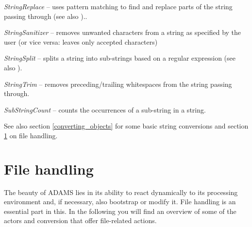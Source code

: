 \begin{tight_itemize}
	\item \textit{StringReplace} -- uses pattern matching to find and replace parts
	of the string passing through (see also \cite{regexp})..
	\item \textit{StringSanitizer} -- removes unwanted characters from a string as
	specified by the user (or vice versa: leaves only accepted characters)
	\item \textit{StringSplit} -- splits a string into sub-strings based on a
	regular expression (see also \cite{regexp}).
	\item \textit{StringTrim} -- removes preceding/trailing whitespaces from the
	string passing through.
	\item \textit{SubStringCount} -- counts the occurrences of a sub-string
	in a string.
\end{tight_itemize}
See also section \ref{converting_objects} for some basic string conversions and
section \ref{file_handling} on file handling.

\clearpage
\section{File handling}
\label{file_handling}
The beauty of ADAMS lies in its ability to react dynamically to its processing
environment and, if necessary, also bootstrap or modify it. File handling is an
essential part in this. In the following you will find an overview of some of
the actors and conversion that offer file-related actions.

